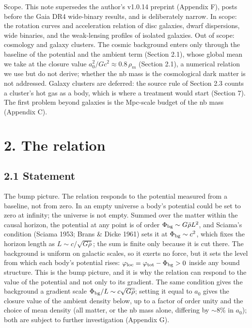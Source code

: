 \documentclass[
  10pt,
]{article}
\begin{document}
Scope. This note supersedes the author's v1.0.14 preprint (Appendix F),
posts before the Gaia DR4 wide-binary results, and is deliberately narrow.
In scope: the rotation curves and acceleration relation of disc galaxies,
dwarf dispersions, wide binaries, and the weak-lensing profiles of
isolated galaxies. Out of scope: cosmology and galaxy clusters. The cosmic background enters only through the baseline of the potential and the ambient term (Section 2.1), whose global mean we take
at the closure value $a_0^2/Gc^2\approx0.8\,\rho_m$ (Section 2.1), a
numerical relation we use but do not derive; whether the nb mass is the
cosmological dark matter is not addressed. Galaxy clusters are deferred:
the source rule of Section 2.3 counts a cluster's hot gas as a body, which
is where a treatment would start (Section 7). The first problem beyond
galaxies is the Mpc-scale budget of the nb mass (Appendix C).

\section{2. The relation}\label{the-law}

\subsection{2.1 Statement}\label{statement}

The bump picture. The relation responds to the potential measured from a
baseline, not from zero. In an empty universe a body's potential could be
set to zero at infinity; the universe is not empty. Summed over the matter
within the causal horizon, the potential at any point is of order
$\Phi_{\rm bg}\sim G\bar\rho L^2$, and Sciama's condition (Sciama 1953;
Brans \& Dicke 1961) sets it at $\Phi_{\rm bg}\sim c^2$, which fixes the
horizon length as $L\sim c/\sqrt{G\bar\rho}$; the sum is finite only
because it is cut there. The background is uniform on galactic scales, so
it exerts no force, but it sets the level from which each body's potential
rises: $\varphi_{\rm loc}=\varphi_{\rm tot}-\Phi_{\rm bg}>0$ inside any
bound structure. This is the bump picture, and it is why the relation can
respond to the value of the potential and not only to its gradient. The
same condition gives the background a gradient scale
$\Phi_{\rm bg}/L\sim c\sqrt{G\bar\rho}$; setting it equal to $a_0$ gives the
closure value of the ambient density below, up to a factor of order unity and the choice of mean density (all matter, or the nb mass alone, differing by $\sim$8\% in $a_0$); both are subject to further investigation (Appendix G).
\end{document}

